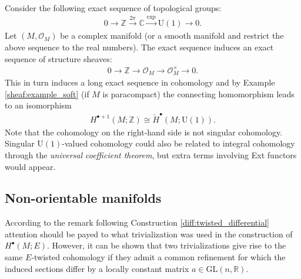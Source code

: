     \begin{property}
        Consider the following exact sequence of topological groups:
        \begin{gather}
            0\longrightarrow\mathbb{Z}\overset{2\pi}{\longrightarrow}\mathbb{C}\overset{\exp}{\longrightarrow}\text{U}(1)\longrightarrow0.
        \end{gather}
        Let $(M,\mathcal{O}_M)$ be a complex manifold (or a smooth manifold and restrict the above sequence to the real numbers). The exact sequence induces an exact sequence of structure sheaves:
        \begin{gather}
            0\longrightarrow\mathbb{Z}\longrightarrow\mathcal{O}_M\longrightarrow\mathcal{O}_M^\times\longrightarrow0.
        \end{gather}
        This in turn induces a long exact sequence in cohomology and by Example \ref{sheaf:example_soft} (if $M$ is paracompact) the connecting homomorphism leads to an isomorphism
        \begin{gather}
            \label{diff:U1_cohomology_isomorphism}
            H^{\bullet+1}(M;\mathbb{Z})\cong\check{H}^\bullet(M;\text{U}(1)).
        \end{gather}
        Note that the cohomology on the right-hand side is not singular cohomology. Singular $\text{U}(1)$-valued cohomology could also be related to integral cohomology through the \textit{universal coefficient theorem}, but extra terms involving Ext functors would appear.
    \end{property}

\subsection{Non-orientable manifolds}

    \begin{remark}
        According to the remark following Construction \ref{diff:twisted_differential} attention should be payed to what trivialization was used in the construction of $H^\bullet(M;E)$. However, it can be shown that two trivializations give rise to the same $E$-twisted cohomology if they admit a common refinement for which the induced sections differ by a locally constant matrix $a\in\text{GL}(n, \mathbb{R})$.
    \end{remark}

